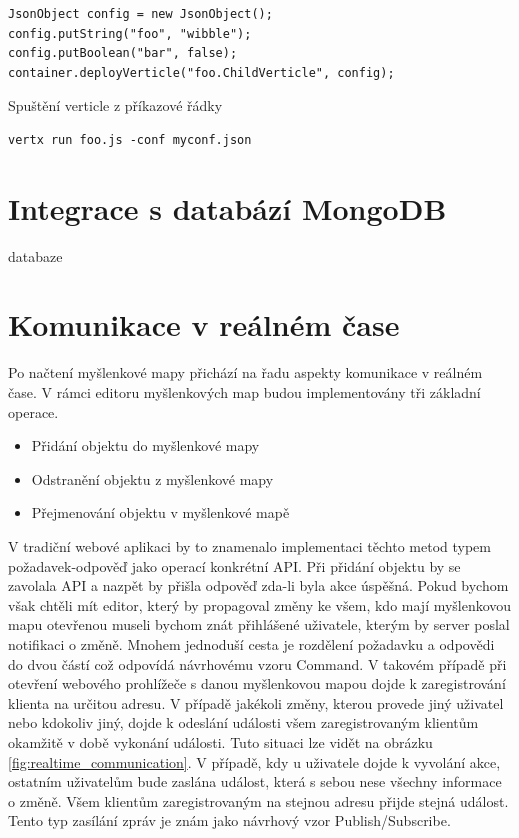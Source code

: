 \begin{lstlisting}
JsonObject config = new JsonObject();
config.putString("foo", "wibble");
config.putBoolean("bar", false);
container.deployVerticle("foo.ChildVerticle", config);
\end{lstlisting}

Spuštění verticle z příkazové řádky
\begin{lstlisting}
vertx run foo.js -conf myconf.json
\end{lstlisting}

\section{Integrace s databází MongoDB}

databaze

\section{Komunikace v reálném čase}\label{sec:realTimeCommunication}

Po načtení myšlenkové mapy přichází na řadu aspekty komunikace v reálném čase. V rámci editoru myšlenkových map budou implementovány tři základní operace.
\begin{itemize}
\item Přidání objektu do myšlenkové mapy
\item Odstranění objektu z myšlenkové mapy
\item Přejmenování objektu v myšlenkové mapě
\end{itemize}
V tradiční webové aplikaci by to znamenalo implementaci těchto metod typem požadavek-odpověď jako operací konkrétní API. Při přidání objektu by se zavolala API a nazpět by přišla odpověď zda-li byla akce úspěšná. Pokud bychom však chtěli mít editor, který by propagoval změny ke všem, kdo mají myšlenkovou mapu otevřenou museli bychom znát přihlášené uživatele, kterým by server poslal notifikaci o změně. Mnohem jednoduší cesta je rozdělení požadavku a odpovědi do dvou částí což odpovídá návrhovému vzoru Command. V takovém případě při otevření webového prohlížeče s danou myšlenkovou mapou dojde k zaregistrování klienta na určitou adresu. V případě jakékoli změny, kterou provede jiný uživatel nebo kdokoliv jiný, dojde k odeslání události všem zaregistrovaným klientům okamžitě v době vykonání události. Tuto situaci lze vidět na obrázku \ref{fig:realtime_communication}. V případě, kdy u uživatele dojde k vyvolání akce, ostatním uživatelům bude zaslána událost, která s sebou nese všechny informace o změně. Všem klientům zaregistrovaným na stejnou adresu přijde stejná událost. Tento typ zasílání zpráv je znám jako návrhový vzor Publish/Subscribe.

